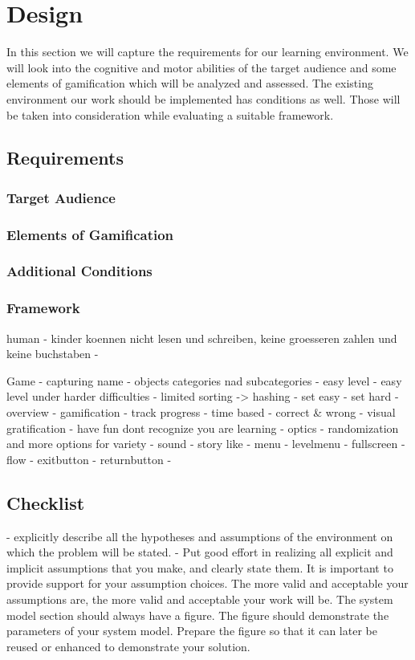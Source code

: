 

\chapter{Design}
\label{chap:design}

In this section we will capture the requirements for our learning environment.
We will look into the cognitive and motor abilities of the target audience and
some elements of gamification which will be analyzed and assessed.
The existing environment our work should be implemented has conditions as well.
Those will be taken into consideration while evaluating a suitable framework.

\section{Requirements}
\subsection*{Target Audience}
\subsection*{Elements of Gamification}
\subsection*{Additional Conditions}
\subsection*{Framework}

human
- kinder koennen nicht lesen und schreiben, keine groesseren zahlen und keine buchstaben
-

Game
- capturing name
- objects categories nad subcategories
- easy level
- easy level under harder difficulties
- limited sorting -> hashing
- set easy
- set hard
- overview
- gamification
    - track progress
        - time based
        - correct & wrong
        - visual gratification
    - have fun dont recognize you are learning
        - optics
            - randomization and more options for variety
        - sound
        - story like
    - menu
    - levelmenu
    - fullscreen
    - flow
        - exitbutton
        - returnbutton
    -


\section{Checklist}
- explicitly describe all the hypotheses and assumptions of the environment on which the problem will be stated.
- Put good effort in realizing all explicit and implicit assumptions that you make, and clearly state them.
It is important to provide support for
your assumption choices. The more valid and acceptable
your assumptions are, the more valid and acceptable your
work will be.
The system model section should always have a figure.
The figure should demonstrate the parameters of your
system model. Prepare the figure so that it can later be
reused or enhanced to demonstrate your solution.

